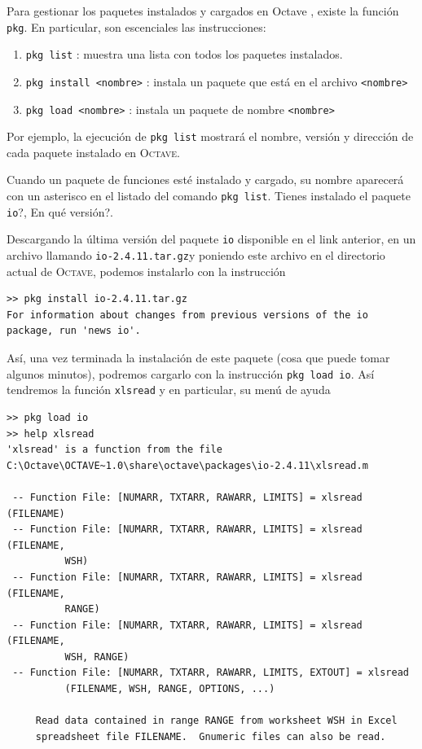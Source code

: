 \documentclass[letter,11pt]{article}
\newcommand\0{\mathbf{0}}
\newcommand{\octave}{{\sc Octave }}
\begin{document}
Para gestionar los paquetes instalados y cargados en \octave, existe la funci\'on \verb"pkg". En particular, son escenciales las instrucciones:

\begin{enumerate}
\item \texttt{pkg list} : muestra una lista con todos los paquetes instalados.
\item \texttt{pkg install <nombre>} : instala un paquete que est\'a en el archivo \texttt{<nombre>}
\item \texttt{pkg load <nombre>} : instala un paquete de nombre \texttt{<nombre>}
\end{enumerate}

Por ejemplo, la ejecuci\'on de \texttt{pkg list} mostrar\'a el nombre, versi\'on y direcci\'on de cada paquete instalado en \textsc{Octave}. 

Cuando un paquete de funciones est\'e instalado y cargado, su nombre aparecer\'a con un asterisco en el listado del comando \verb"pkg list". \textquestiondown Tienes instalado el paquete \texttt{io}?, \textquestiondown En qu\'e versi\'on?.

Descargando la \'ultima versi\'on del paquete \texttt{io} disponible en el link anterior, en un archivo llamando \texttt{io-2.4.11.tar.gz}y poniendo este archivo en el directorio actual de \textsc{Octave}, podemos instalarlo con la instrucci\'on

\begin{lstlisting}
>> pkg install io-2.4.11.tar.gz
For information about changes from previous versions of the io package, run 'news io'.
\end{lstlisting}
As\'i, una vez terminada la instalaci\'on de este paquete (cosa que puede tomar algunos minutos), podremos cargarlo con la instrucci\'on 
\texttt{pkg load io}. As\'i tendremos la funci\'on \texttt{xlsread} y en particular, su men\'u de ayuda
\begin{lstlisting}
>> pkg load io
>> help xlsread
'xlsread' is a function from the file C:\Octave\OCTAVE~1.0\share\octave\packages\io-2.4.11\xlsread.m

 -- Function File: [NUMARR, TXTARR, RAWARR, LIMITS] = xlsread (FILENAME)
 -- Function File: [NUMARR, TXTARR, RAWARR, LIMITS] = xlsread (FILENAME,
          WSH)
 -- Function File: [NUMARR, TXTARR, RAWARR, LIMITS] = xlsread (FILENAME,
          RANGE)
 -- Function File: [NUMARR, TXTARR, RAWARR, LIMITS] = xlsread (FILENAME,
          WSH, RANGE)
 -- Function File: [NUMARR, TXTARR, RAWARR, LIMITS, EXTOUT] = xlsread
          (FILENAME, WSH, RANGE, OPTIONS, ...)

     Read data contained in range RANGE from worksheet WSH in Excel
     spreadsheet file FILENAME.  Gnumeric files can also be read.
\end{lstlisting}
\end{document}
